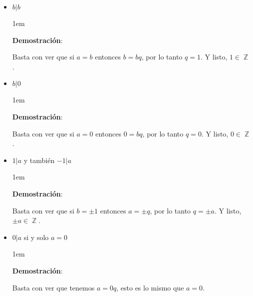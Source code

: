 \documentclass[12pt, fleqn]{report}                             %
\newenvironment{SmallIndentation}[1][0.75em]                    %
    {\begin{adjustwidth}{#1}{}\begin{footnotesize}}                 %
    {\end{footnotesize}\end{adjustwidth}}                           %
\DeclareMathOperator \Integers  {\mathbb{Z}}                     %
\begin{document}
            \begin{itemize}

                \item $b|b$

                    \begin{SmallIndentation}[1em]
                        \textbf{Demostración}:

                        Basta con ver que si $a = b$ entonces $b = bq$, por lo tanto $q = 1$.
                        Y listo, $1 \in \Integers$.

                    \end{SmallIndentation}

                \item $b|0$

                    \begin{SmallIndentation}[1em]
                        \textbf{Demostración}:

                        Basta con ver que si $a = 0$ entonces $0 = bq$, por lo tanto $q = 0$.
                        Y listo, $0 \in \Integers$.

                    \end{SmallIndentation}

                \item $1|a$ y también $-1|a$

                    \begin{SmallIndentation}[1em]
                        \textbf{Demostración}:

                        Basta con ver que si $b = \pm 1$ entonces $a = \pm q$, por lo tanto $q = \pm a$.
                        Y listo, $\pm a \in \Integers$.

                    \end{SmallIndentation}
            
                \item $0|a$ si y solo $a=0$

                    \begin{SmallIndentation}[1em]
                        \textbf{Demostración}:

                        Basta con ver que tenemos $a = 0q$, esto es lo mismo que $a = 0$.

                    \end{SmallIndentation}


\end{itemize}
\end{document}
